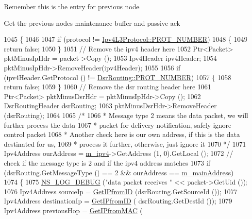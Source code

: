 Remember this is the entry for previous node

Get the previous node\textquotesingle{}s maintenance buffer and passive ack 
\begin{DoxyCode}
1045 \{
1046 
1047   \textcolor{keywordflow}{if} (protocol != \hyperlink{classns3_1_1Ipv4L3Protocol_a0146bc84815b7b73adb9c62cdafc9442}{Ipv4L3Protocol::PROT\_NUMBER})
1048     \{
1049       \textcolor{keywordflow}{return} \textcolor{keyword}{false};
1050     \}
1051   \textcolor{comment}{// Remove the ipv4 header here}
1052   Ptr<Packet> pktMinusIpHdr = packet->Copy ();
1053   Ipv4Header ipv4Header;
1054   pktMinusIpHdr->RemoveHeader(ipv4Header);
1055 
1056   \textcolor{keywordflow}{if} (ipv4Header.GetProtocol () != \hyperlink{classns3_1_1dsr_1_1DsrRouting_a66248f69fcf97af91d6fe17d70617cc9}{DsrRouting::PROT\_NUMBER})
1057     \{
1058       \textcolor{keywordflow}{return} \textcolor{keyword}{false};
1059     \}
1060   \textcolor{comment}{// Remove the dsr routing header here}
1061   Ptr<Packet> pktMinusDsrHdr = pktMinusIpHdr->Copy ();
1062   DsrRoutingHeader dsrRouting;
1063   pktMinusDsrHdr->RemoveHeader (dsrRouting);
1064 
1065   \textcolor{comment}{/*}
1066 \textcolor{comment}{   * Message type 2 means the data packet, we will further process the data}
1067 \textcolor{comment}{   * packet for delivery notification, safely ignore control packet}
1068 \textcolor{comment}{   * Another check here is our own address, if this is the data destinated for us,}
1069 \textcolor{comment}{   * process it further, otherwise, just ignore it}
1070 \textcolor{comment}{   */}
1071   Ipv4Address ourAddress = \hyperlink{classns3_1_1dsr_1_1DsrRouting_aa42c1b9ee27c8168a2141d3d032006c3}{m\_ipv4}->GetAddress (1, 0).GetLocal ();
1072   \textcolor{comment}{// check if the message type is 2 and if the ipv4 address matches}
1073   \textcolor{keywordflow}{if} (dsrRouting.GetMessageType () == 2 && ourAddress == \hyperlink{classns3_1_1dsr_1_1DsrRouting_a73182b5edee2d8460f28855e058fc9a0}{m\_mainAddress})
1074     \{
1075       \hyperlink{group__logging_ga413f1886406d49f59a6a0a89b77b4d0a}{NS\_LOG\_DEBUG} (\textcolor{stringliteral}{"data packet receives "} << packet->GetUid ());
1076       Ipv4Address sourceIp = \hyperlink{classns3_1_1dsr_1_1DsrRouting_abaf6e655b3bf50d3002c3739409d23a6}{GetIPfromID} (dsrRouting.GetSourceId ());
1077       Ipv4Address destinationIp = \hyperlink{classns3_1_1dsr_1_1DsrRouting_abaf6e655b3bf50d3002c3739409d23a6}{GetIPfromID} ( dsrRouting.GetDestId ());
1079       Ipv4Address previousHop = \hyperlink{classns3_1_1dsr_1_1DsrRouting_a5914e79eec0e5e33be08f55321e8aaea}{GetIPfromMAC} (

\end{DoxyCode}
